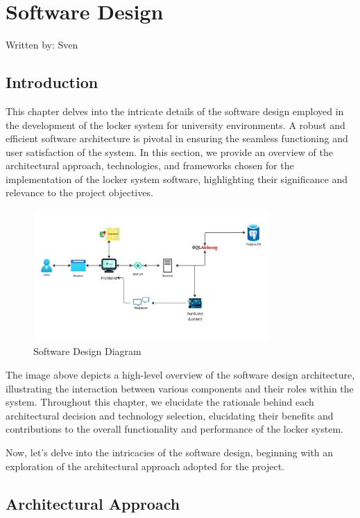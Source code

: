 \section{Software Design}
\tiny{Written by: Sven}

\subsection{Introduction}

This chapter delves into the intricate details of the software design employed in the
development of the locker system for university environments. A robust and efficient
software architecture is pivotal in ensuring the seamless functioning and user satisfaction
of the system. In this section, we provide an overview of the architectural approach,
technologies, and frameworks chosen for the implementation of the locker system software,
highlighting their significance and relevance to the project objectives.

\begin{figure}[h]
    \centering
    \includegraphics[width=0.8\textwidth]{images/software_design_diagram}
    \caption{Software Design Diagram}
    \label{fig:software_design}
\end{figure}

The image above depicts a high-level overview of the software design architecture,
illustrating the interaction between various components and their roles within the system.
Throughout this chapter, we elucidate the rationale behind each architectural decision
and technology selection, elucidating their benefits and contributions to the overall
functionality and performance of the locker system.

Now, let's delve into the intricacies of the software design, beginning with an exploration
of the architectural approach adopted for the project.


\subsection{Architectural Approach}

